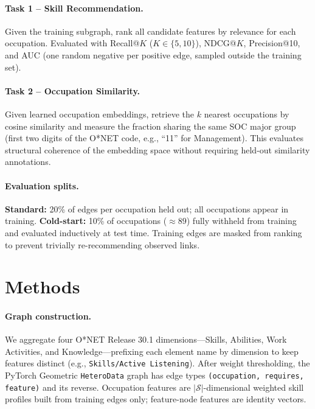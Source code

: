 \documentclass{article}
\begin{document}
\paragraph{Task 1 -- Skill Recommendation.}
Given the training subgraph, rank all candidate features by relevance for
each occupation.
Evaluated with Recall@$K$ ($K\in\{5,10\}$), NDCG@$K$,
Precision@10, and AUC (one random negative per positive edge, sampled
outside the training set).

\paragraph{Task 2 -- Occupation Similarity.}
Given learned occupation embeddings, retrieve the $k$ nearest occupations
by cosine similarity and measure the fraction sharing the same SOC major
group (first two digits of the O*NET code, e.g., ``11'' for Management).
This evaluates structural coherence of the embedding space without
requiring held-out similarity annotations.

\paragraph{Evaluation splits.}
\textbf{Standard:} 20\% of edges per occupation held out; all occupations
appear in training.
\textbf{Cold-start:} 10\% of occupations ($\approx 89$) fully withheld from
training and evaluated inductively at test time.
Training edges are masked from ranking to prevent trivially re-recommending
observed links.

\section{Methods}

\paragraph{Graph construction.}
We aggregate four O*NET Release 30.1 dimensions---Skills, Abilities, Work
Activities, and Knowledge---prefixing each element name by dimension to keep
features distinct (e.g., \texttt{Skills/Active Listening}).
After weight thresholding, the PyTorch Geometric \texttt{HeteroData} graph
has edge types \texttt{(occupation, requires, feature)} and its reverse.
Occupation features are $|\mathcal{S}|$-dimensional weighted skill profiles
built from training edges only; feature-node features are identity vectors.
\end{document}
